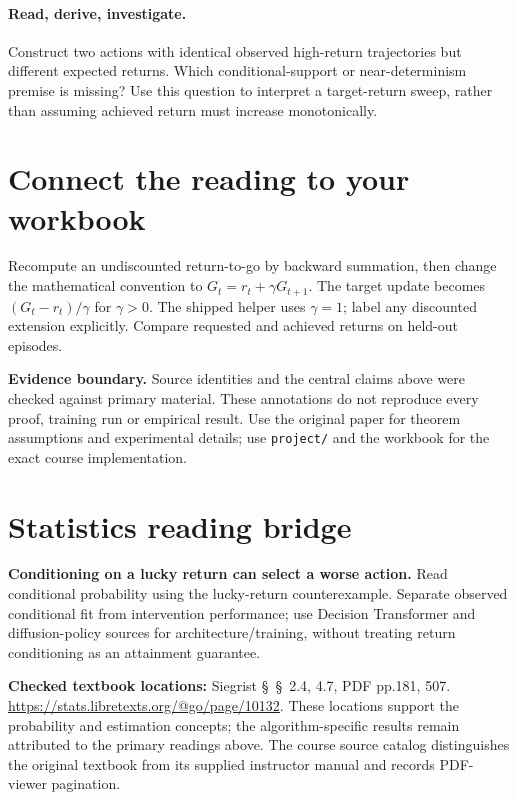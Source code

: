 \documentclass[11pt]{scrartcl}
\begin{document}
\paragraph{Read, derive, investigate.} Construct two actions with identical observed high-return trajectories but different expected returns. Which conditional-support or near-determinism premise is missing? Use this question to interpret a target-return sweep, rather than assuming achieved return must increase monotonically.

\section*{Connect the reading to your workbook}
Recompute an undiscounted return-to-go by backward summation, then change the mathematical convention to $G_t=r_t+\gamma G_{t+1}$. The target update becomes $(G_t-r_t)/\gamma$ for $\gamma>0$. The shipped helper uses $\gamma=1$; label any discounted extension explicitly. Compare requested and achieved returns on held-out episodes.

\noindent\textbf{Evidence boundary.} Source identities and the central claims above were checked against primary material. These annotations do not reproduce every proof, training run or empirical result. Use the original paper for theorem assumptions and experimental details; use \texttt{project/} and the workbook for the exact course implementation.
\section*{Statistics reading bridge}
\textbf{Conditioning on a lucky return can select a worse action.} Read conditional probability using the lucky-return counterexample. Separate observed conditional fit from intervention performance; use Decision Transformer and diffusion-policy sources for architecture/training, without treating return conditioning as an attainment guarantee.

\textbf{Checked textbook locations:} Siegrist \S~\S~2.4, 4.7, PDF pp.181, 507. \url{https://stats.libretexts.org/@go/page/10132}. These locations support the probability and estimation concepts; the algorithm-specific results remain attributed to the primary readings above. The course source catalog distinguishes the original textbook from its supplied instructor manual and records PDF-viewer pagination.
\end{document}
